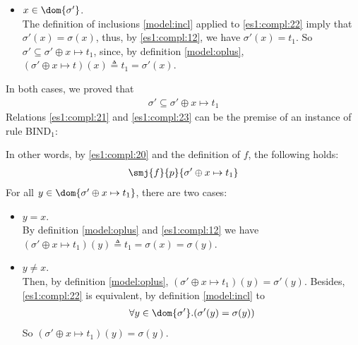 \begin{enumerate}
\begin{enumerate}
\begin{enumerate}
\begin{itemize}
              \item \(x \in \dom{\sigma'}\).\\ The definition of
                inclusions \eqref{model:incl} applied to
                \eqref{es1:compl:22} imply that \(\sigma'(x) =
                \sigma(x)\), thus, by \eqref{es1:compl:12}, we have
                \(\sigma'(x) = t_1\). So \(\sigma' \subseteq \sigma'
                \oplus x \mapsto t_1\), since, by definition
                \eqref{model:oplus}, \((\sigma' \oplus x \mapsto t)(x)
                \triangleq t_1 = \sigma'(x)\).

            \end{itemize}
            In both cases, we proved that
            \begin{gather}
              \sigma' \subseteq \sigma' \oplus x \mapsto t_1
              \label{es1:compl:23}
            \end{gather}
            Relations \eqref{es1:compl:21} and \eqref{es1:compl:23}
            can be the premise of an instance of rule
            \textsf{BIND}\(_1\):
            In other words, by \eqref{es1:compl:20} and the definition
            of \(f\), the following holds:
            \begin{gather}
              \smj{f}{{p}}{\sigma' \oplus x \mapsto
                t_1} \label{es1:compl:24}
            \end{gather}
            For all \(y \in \dom{\sigma' \oplus x \mapsto t_1}\),
            there are two cases:
            \begin{itemize}

              \item \(y = x\).\\ By definition \eqref{model:oplus} and
                \eqref{es1:compl:12} we have \((\sigma' \oplus x
                \mapsto t_1)(y) \triangleq t_1 = \sigma(x) =
                \sigma(y)\).

              \item \(y \neq x\).\\Then, by definition
                \eqref{model:oplus}, \((\sigma' \oplus x \mapsto
                t_1)(y) = \sigma'(y)\).  Besides, \eqref{es1:compl:22}
                is equivalent, by definition \eqref{model:incl} to
                \begin{gather*}
                  \forall y \in \dom{\sigma'}.(\sigma'(y) =
                  \sigma(y))
                \end{gather*}
                So \((\sigma' \oplus x \mapsto t_1)(y) = \sigma(y)\).


\end{itemize}
\end{enumerate}
\end{enumerate}
\end{enumerate}
